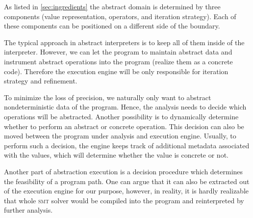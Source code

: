 As listed in \autoref{sec:ingredients} the abstract domain is determined by
three components (value representation, operators, and iteration strategy).
Each of these components can be positioned on a different side of the boundary.

The typical approach in abstract interpreters is to keep all of them inside of
the interpreter. However, we can let the program to maintain abstract data and
instrument abstract operations into the program (realize them as a concrete
code). Therefore the execution engine will be only responsible for iteration
strategy and refinement.

To minimize the loss of precision, we naturally only want to abstract
nondeterministic data of the program. Hence, the analysis needs to decide which
operations will be abstracted. Another possibility is to dynamically determine
whether to perform an abstract or concrete operation. This decision can also be
moved between the program under analysis and execution engine. Usually, to
perform such a decision, the engine keeps track of additional metadata
associated with the values, which will determine whether the value is concrete
or not.

Another part of abstraction execution is a decision procedure which determines
the feasibility of a program path. One can argue that it can also be extracted
out of the execution engine for our purpose, however, in reality, it is hardly
realizable that whole \textsc{smt} solver would be compiled into the program and
reinterpreted by further analysis.

